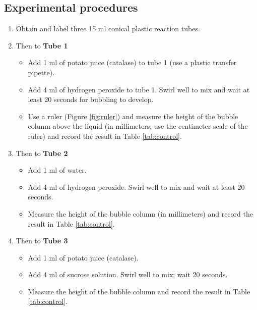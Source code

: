 \documentclass[]{book}
\providecommand{\tightlist}{%
  \setlength{\itemsep}{0pt}\setlength{\parskip}{0pt}}
\begin{document}
\hypertarget{experimental-procedures-20}{%
\subsection{Experimental procedures}\label{experimental-procedures-20}}

\begin{enumerate}
\def\labelenumi{\arabic{enumi}.}
\tightlist
\item
  Obtain and label three 15 ml conical plastic reaction tubes.
\item
  Then to \textbf{Tube 1}

  \begin{itemize}
  \tightlist
  \item
    Add 1 ml of potato juice (catalase) to tube 1 (use a plastic transfer pipette).
  \item
    Add 4 ml of hydrogen peroxide to tube 1. Swirl well to mix and wait at least 20 seconds for bubbling to develop.
  \item
    Use a ruler (Figure \ref{fig:ruler}) and measure the height of the bubble column above the liquid (in millimeters; use the centimeter scale of the ruler) and record the result in Table \ref{tab:control}.
  \end{itemize}
\item
  Then to \textbf{Tube 2}

  \begin{itemize}
  \tightlist
  \item
    Add 1 ml of water.
  \item
    Add 4 ml of hydrogen peroxide. Swirl well to mix and wait at least 20 seconds.
  \item
    Measure the height of the bubble column (in millimeters) and record the result in Table \ref{tab:control}.
  \end{itemize}
\item
  Then to \textbf{Tube 3}

  \begin{itemize}
  \tightlist
  \item
    Add 1 ml of potato juice (catalase).
  \item
    Add 4 ml of sucrose solution. Swirl well to mix; wait 20 seconds.
  \item
    Measure the height of the bubble column and record the result in Table \ref{tab:control}.
  \end{itemize}
\end{enumerate}
\end{document}
